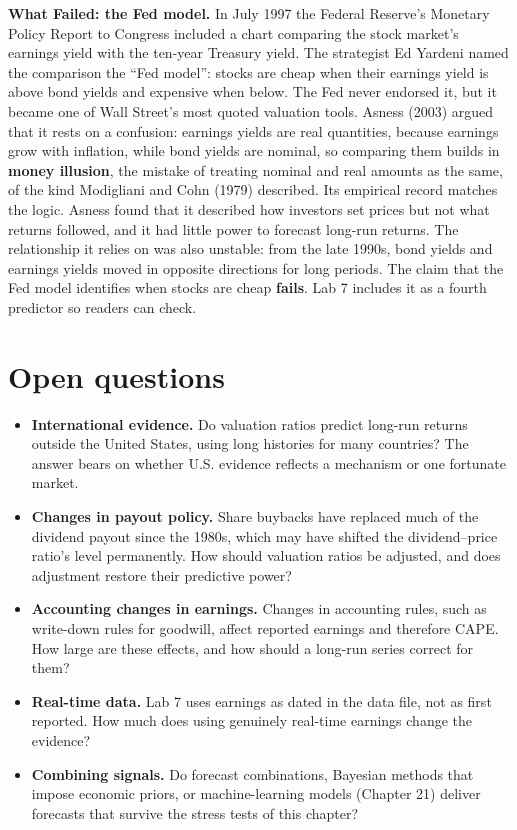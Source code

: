 \begin{callout}
\textbf{What Failed: the Fed model.} In July 1997 the Federal Reserve's Monetary Policy Report to Congress included a chart comparing the stock market's earnings yield with the ten-year Treasury yield. The strategist Ed Yardeni named the comparison the ``Fed model'': stocks are cheap when their earnings yield is above bond yields and expensive when below. The Fed never endorsed it, but it became one of Wall Street's most quoted valuation tools. Asness (2003) argued that it rests on a confusion: earnings yields are real quantities, because earnings grow with inflation, while bond yields are nominal, so comparing them builds in \textbf{money illusion}, the mistake of treating nominal and real amounts as the same, of the kind Modigliani and Cohn (1979) described. Its empirical record matches the logic. Asness found that it described how investors set prices but not what returns followed, and it had little power to forecast long-run returns. The relationship it relies on was also unstable: from the late 1990s, bond yields and earnings yields moved in opposite directions for long periods. The claim that the Fed model identifies when stocks are cheap \textbf{fails}. Lab 7 includes it as a fourth predictor so readers can check.
\end{callout}

\section{Open questions}
\label{sec:07-open}

\begin{itemize}
  \item \textbf{International evidence.} Do valuation ratios predict long-run returns outside the United States, using long histories for many countries? The answer bears on whether U.S. evidence reflects a mechanism or one fortunate market.
  \item \textbf{Changes in payout policy.} Share buybacks have replaced much of the dividend payout since the 1980s, which may have shifted the dividend--price ratio's level permanently. How should valuation ratios be adjusted, and does adjustment restore their predictive power?
  \item \textbf{Accounting changes in earnings.} Changes in accounting rules, such as write-down rules for goodwill, affect reported earnings and therefore CAPE. How large are these effects, and how should a long-run series correct for them?
  \item \textbf{Real-time data.} Lab 7 uses earnings as dated in the data file, not as first reported. How much does using genuinely real-time earnings change the evidence?
  \item \textbf{Combining signals.} Do forecast combinations, Bayesian methods that impose economic priors, or machine-learning models (Chapter 21) deliver forecasts that survive the stress tests of this chapter?
\end{itemize}

